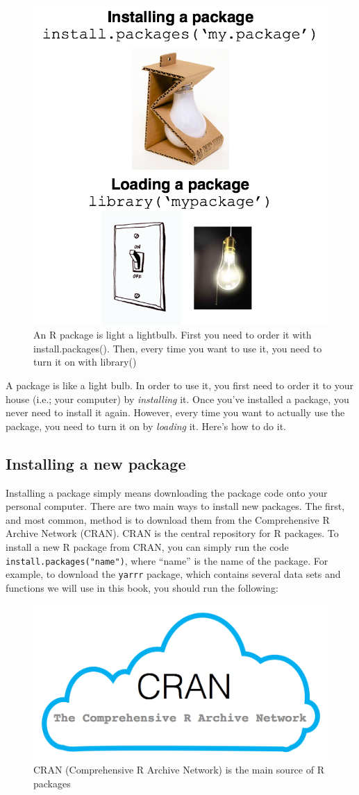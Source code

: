 \documentclass[]{book}
\theoremstyle{definition}
\theoremstyle{definition}
\theoremstyle{remark}
\begin{document}
\begin{figure}

{\centering \includegraphics[width=0.5\linewidth]{images/packagebulb} 

}

\caption{An R package is light a lightbulb. First you need to order it with install.packages(). Then, every time you want to use it, you need to turn it on with library()}\label{fig:package}
\end{figure}

A package is like a light bulb. In order to use it, you first need to
order it to your house (i.e.; your computer) by \emph{installing} it.
Once you've installed a package, you never need to install it again.
However, every time you want to actually use the package, you need to
turn it on by \emph{loading} it. Here's how to do it.

\subsection{Installing a new package}\label{installing-a-new-package}

Installing a package simply means downloading the package code onto your
personal computer. There are two main ways to install new packages. The
first, and most common, method is to download them from the
Comprehensive R Archive Network (CRAN). CRAN is the central repository
for R packages. To install a new R package from CRAN, you can simply run
the code \texttt{install.packages("name")}, where ``name'' is the name
of the package. For example, to download the \texttt{yarrr} package,
which contains several data sets and functions we will use in this book,
you should run the following:

\begin{figure}

{\centering \includegraphics[width=0.5\linewidth]{images/cran} 

}

\caption{CRAN (Comprehensive R Archive Network) is the main source of R packages}\label{fig:cran}
\end{figure}
\end{document}
